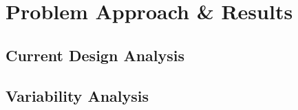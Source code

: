 \chapter{Problem Approach \& Results}\label{chap:problem_approach_results}

\section{Current Design Analysis}\label{sec:current_design_analysis}

\section{Variability Analysis}\label{sec:variability_analysis}

